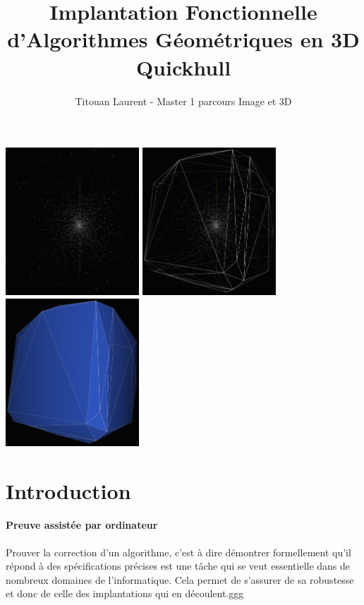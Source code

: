 \documentclass[]{article}
\title{Implantation Fonctionnelle \\ d'Algorithmes Géométriques en 3D \\
  \large Quickhull}
\author{Titouan Laurent - Master 1 parcours Image et 3D}
\date{}
\begin{document}
\maketitle

\includegraphics[width=5cm]{illus/illus0.png}
\includegraphics[width=5cm]{illus/illus1.png}
\includegraphics[width=5cm]{illus/illus2.png}

\newpage
\tableofcontents
\newpage

\section{Introduction}
\paragraph{Preuve assistée par ordinateur}
Prouver la correction d'un algorithme, c'est à dire démontrer formellement qu'il répond à des spécifications précises est une tâche qui se veut essentielle dans de nombreux domaines de l'informatique. Cela permet de s'assurer de sa robustesse et donc de celle des implantations qui en découlent.ggg
\end{document}
